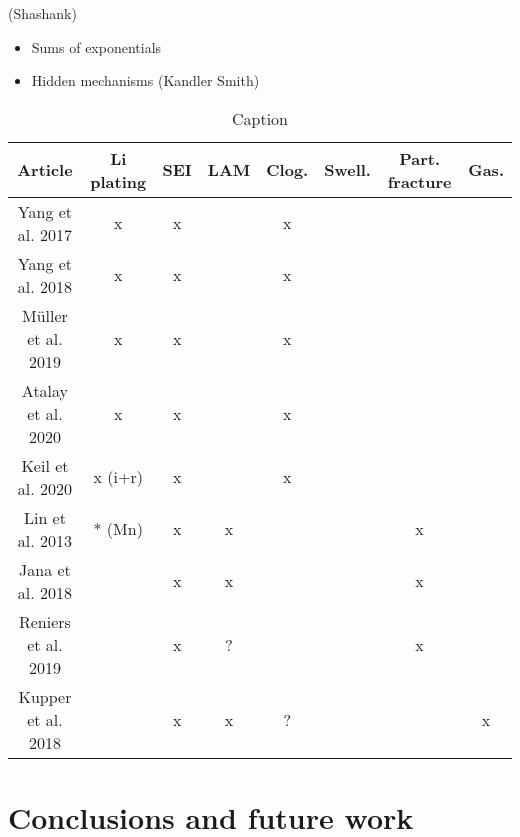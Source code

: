 \documentclass{article}
\begin{document}
(Shashank)
\begin{itemize}
    \item Sums of exponentials
    \item Hidden mechanisms (Kandler Smith)
\end{itemize}

\begin{table}[]
    \centering
    \begin{tabular}{c|c|c|c|c|c|c|c}
        Article & Li plating & SEI & LAM & Clog. & Swell. & Part. fracture & Gas. \\ \hline
        Yang et al. 2017 \cite{yang_modeling_2017} & x & x & & x & & & \\
        Yang et al. 2018 \cite{yang_understanding_2018} & x & x & & x & & & \\
        M\"uller et al. 2019 \cite{muller_model-based_2019} & x & x & & x & & & \\
        Atalay et al. 2020 \cite{atalay_theory_2020} & x & x & & x & & & \\
        Keil et al. 2020 \cite{keil_electrochemical_2020} & x (i+r) & x & & x & & & \\ \hline
        Lin et al. 2013 \cite{lin_comprehensive_2013} & * (Mn) & x & x & & & x & \\
        Jana et al. 2018 \cite{jana_physical_2019} & & x & x & & & x & \\
        Reniers et al. 2019 \cite{reniers_review_2019} & & x & ? & & & x & \\ \hline
        Kupper et al. 2018 \cite{kupper_end--life_2018} & & x & x & ? & & & x \\
    \end{tabular}
    \caption{Caption}
    \label{tab:physics_models}
\end{table}

\section{Conclusions and future work}



\end{document}
